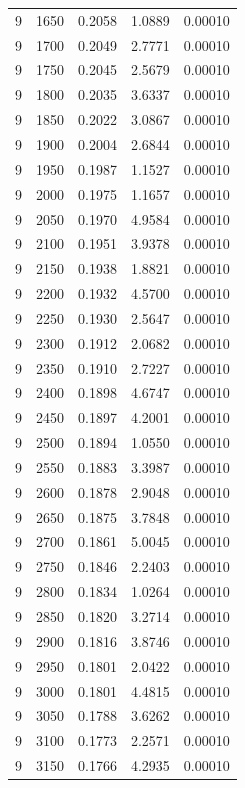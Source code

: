 \begin{longtable}{ccccc}
    9 & 1650 & 0.2058 & 1.0889 & 0.00010 \\
    9 & 1700 & 0.2049 & 2.7771 & 0.00010 \\
    9 & 1750 & 0.2045 & 2.5679 & 0.00010 \\
    9 & 1800 & 0.2035 & 3.6337 & 0.00010 \\
    9 & 1850 & 0.2022 & 3.0867 & 0.00010 \\
    9 & 1900 & 0.2004 & 2.6844 & 0.00010 \\
    9 & 1950 & 0.1987 & 1.1527 & 0.00010 \\
    9 & 2000 & 0.1975 & 1.1657 & 0.00010 \\
    9 & 2050 & 0.1970 & 4.9584 & 0.00010 \\
    9 & 2100 & 0.1951 & 3.9378 & 0.00010 \\
    9 & 2150 & 0.1938 & 1.8821 & 0.00010 \\
    9 & 2200 & 0.1932 & 4.5700 & 0.00010 \\
    9 & 2250 & 0.1930 & 2.5647 & 0.00010 \\
    9 & 2300 & 0.1912 & 2.0682 & 0.00010 \\
    9 & 2350 & 0.1910 & 2.7227 & 0.00010 \\
    9 & 2400 & 0.1898 & 4.6747 & 0.00010 \\
    9 & 2450 & 0.1897 & 4.2001 & 0.00010 \\
    9 & 2500 & 0.1894 & 1.0550 & 0.00010 \\
    9 & 2550 & 0.1883 & 3.3987 & 0.00010 \\
    9 & 2600 & 0.1878 & 2.9048 & 0.00010 \\
    9 & 2650 & 0.1875 & 3.7848 & 0.00010 \\
    9 & 2700 & 0.1861 & 5.0045 & 0.00010 \\
    9 & 2750 & 0.1846 & 2.2403 & 0.00010 \\
    9 & 2800 & 0.1834 & 1.0264 & 0.00010 \\
    9 & 2850 & 0.1820 & 3.2714 & 0.00010 \\
    9 & 2900 & 0.1816 & 3.8746 & 0.00010 \\
    9 & 2950 & 0.1801 & 2.0422 & 0.00010 \\
    9 & 3000 & 0.1801 & 4.4815 & 0.00010 \\
    9 & 3050 & 0.1788 & 3.6262 & 0.00010 \\
    9 & 3100 & 0.1773 & 2.2571 & 0.00010 \\
    9 & 3150 & 0.1766 & 4.2935 & 0.00010 \\

\end{longtable}
